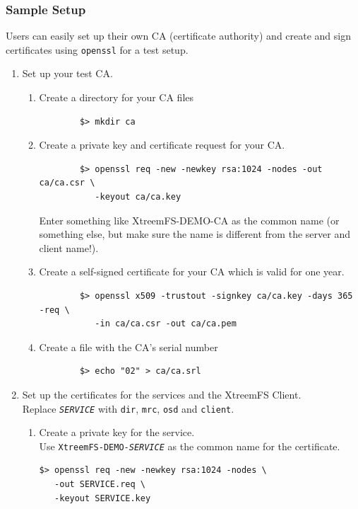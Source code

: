 \documentclass[a4paper,10pt]{book}
\begin{document}
\subsubsection{Sample Setup}

Users can easily set up their own CA (certificate authority) and create and sign certificates using \texttt{openssl} for a test setup.

\begin{enumerate}
 \item Set up your test CA.
	\begin{enumerate}
	\item Create a directory for your CA files
		\begin{verbatim}
		$> mkdir ca
		\end{verbatim}

	\item Create a private key and certificate request for your CA.
		\begin{verbatim}
		$> openssl req -new -newkey rsa:1024 -nodes -out ca/ca.csr \
		   -keyout ca/ca.key
		\end{verbatim}

		Enter something like XtreemFS-DEMO-CA as the common name (or something else, but make sure the name is different from the server and client name!).
	\item Create a self-signed certificate for your CA which is valid for one year.
		\begin{verbatim}
		$> openssl x509 -trustout -signkey ca/ca.key -days 365 -req \
		   -in ca/ca.csr -out ca/ca.pem
		\end{verbatim}

	\item Create a file with the CA's serial number
		\begin{verbatim}
		$> echo "02" > ca/ca.srl
		\end{verbatim}

 \end{enumerate}
 \item Set up the certificates for the services and the XtreemFS Client.\\
	Replace \texttt{\textit{SERVICE}} with \texttt{dir}, \texttt{mrc}, \texttt{osd} and \texttt{client}.
	\begin{enumerate}
	\item Create a private key for the service.\\
	      Use \texttt{XtreemFS-DEMO-\textit{SERVICE}} as the common name for the certificate.
		\begin{verbatim}
$> openssl req -new -newkey rsa:1024 -nodes \
   -out SERVICE.req \
   -keyout SERVICE.key
		\end{verbatim}


\end{enumerate}
\end{enumerate}
\end{document}

